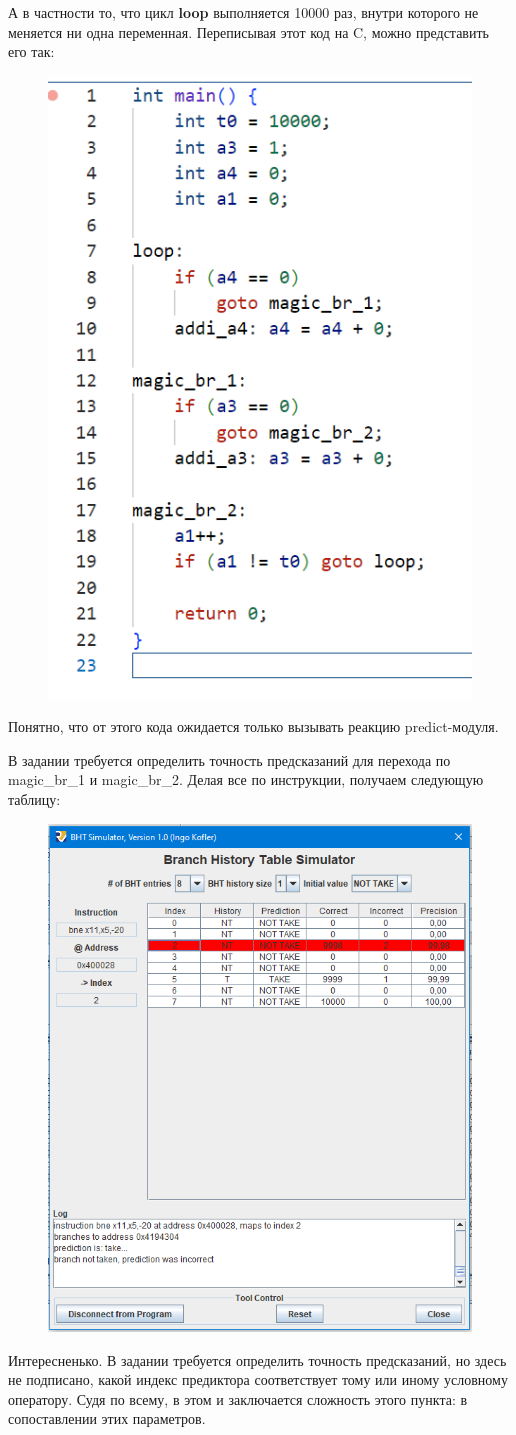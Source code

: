А в частности то, что цикл \textbf{loop} выполняется 10000 раз, внутри которого не меняется ни одна переменная. Переписывая этот код на C, можно представить его так:
\begin{figure}[H]
    \centering
    \includegraphics[width=0.5\linewidth]{Part1/c-code.png}
\end{figure}
Понятно, что от этого кода ожидается только вызывать реакцию predict-модуля.

В задании требуется определить точность предсказаний для перехода по magic\_br\_1 и magic\_br\_2. Делая все по инструкции, получаем следующую таблицу:
\begin{figure}[H]
    \centering
    \includegraphics[width=0.5\linewidth]{Part1/BHT.png}
\end{figure}

Интересненько. В задании требуется определить точность предсказаний, но здесь не подписано, какой индекс предиктора соответствует тому или иному условному оператору. Судя по всему, в этом и заключается сложность этого пункта: в сопоставлении этих параметров. 

